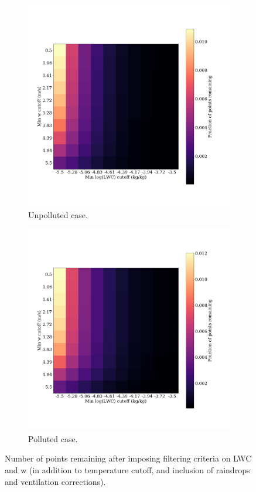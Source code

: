 \documentclass{article}
\begin{document}
\begin{figure}[ht]
	\centering
	\begin{subfigure}{0.7\textwidth}
		\includegraphics[width=\textwidth]{revmywrf/v3_npts_heatmap_Unpolluted_figure.png}
		\caption{Unpolluted case.}
		\label{nptsheatmapunpoll}
	\end{subfigure}
	\begin{subfigure}{0.7\textwidth}
		\includegraphics[width=\textwidth]{revmywrf/v3_npts_heatmap_Polluted_figure.png}
		\caption{Polluted case.}
		\label{nptsheatmappoll}
	\end{subfigure}
	\caption{Number of points remaining after imposing filtering criteria on LWC and w (in addition to temperature cutoff, and inclusion of raindrops and ventilation corrections).}
	\label{nptsheatmap}
\end{figure}
\end{document}
